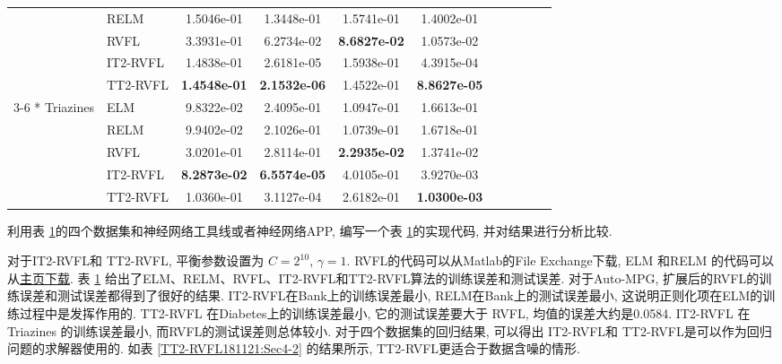 \begin{table} [H]
\begin{center}
\begin{tabular} {llccccccccc}
&RELM   &1.5046e-01   &1.3448e-01   &1.5741e-01   &1.4002e-01 \\
&RVFL &3.3931e-01  & 6.2734e-02   &\textbf{8.6827e-02}  &  1.0573e-02\\
&IT2-RVFL&1.4838e-01  & 2.6181e-05  & 1.5938e-01  & 4.3915e-04\\
&TT2-RVFL&\textbf{1.4548e-01}  &  \textbf{2.1532e-06}   & 1.4522e-01  & \textbf{8.8627e-05} \\
\cline{3-6}
\multirow{5} {*} {Triazines} &ELM &9.8322e-02   &2.4095e-01   &1.0947e-01   &1.6613e-01   \\
&RELM    &9.9402e-02   &2.1026e-01   &1.0739e-01   &1.6718e-01\\
&RVFL &3.0201e-01 &  2.8114e-01  & \textbf{2.2935e-02}   & 1.3741e-02\\
&IT2-RVFL&\textbf{8.2873e-02}  &  \textbf{6.5574e-05}  &  4.0105e-01  & 3.9270e-03\\
&TT2-RVFL&1.0360e-01  & 3.1127e-04 &  2.6182e-01 &  \textbf{1.0300e-03} \\
\hline
\end{tabular}
\end{center}
\label{TT2-RVFL181116:Sec4-1}
\end{table}
\begin{remark}
   利用表 \ref{TT2-RVFL181116:Sec4-1}的四个数据集和神经网络工具线或者神经网络APP, 编写一个表 \ref{TT2-RVFL181116:Sec4-1}的实现代码, 并对结果进行分析比较.
\end{remark}
对于IT2-RVFL和 TT2-RVFL, 平衡参数设置为 $C=2^{10}$, $\gamma =1$.
RVFL的代码可以从Matlab的File Exchange下载,  ELM 和RELM 的代码可以从\href{https://www.ntu.edu.sg/home/egbhuang/elm_random_hidden_nodes.html}{主页下载}.
表 \ref{TT2-RVFL181116:Sec4-1} 给出了ELM、RELM、RVFL、IT2-RVFL和TT2-RVFL算法的训练误差和测试误差.
对于Auto-MPG, 扩展后的RVFL的训练误差和测试误差都得到了很好的结果.
IT2-RVFL在Bank上的训练误差最小, RELM在Bank上的测试误差最小, 这说明正则化项在ELM的训练过程中是发挥作用的.
TT2-RVFL 在Diabetes上的训练误差最小, 它的测试误差要大于 RVFL, 均值的误差大约是0.0584.
IT2-RVFL 在Triazines 的训练误差最小, 而RVFL的测试误差则总体较小.
对于四个数据集的回归结果, 可以得出 IT2-RVFL和 TT2-RVFL是可以作为回归问题的求解器使用的.
如表 \ref{TT2-RVFL181121:Sec4-2} 的结果所示, TT2-RVFL更适合于数据含噪的情形.
